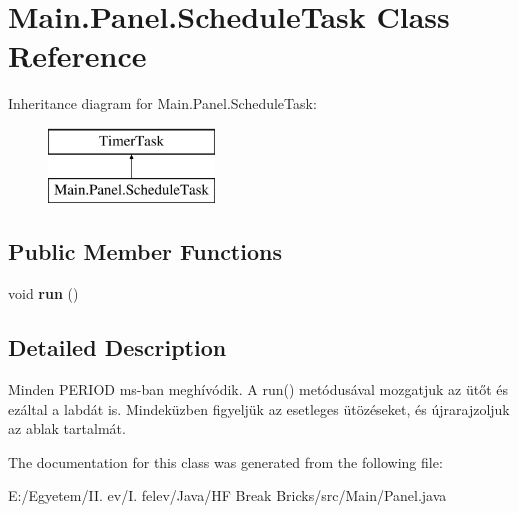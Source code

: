 \hypertarget{class_main_1_1_panel_1_1_schedule_task}{}\section{Main.\+Panel.\+Schedule\+Task Class Reference}
\label{class_main_1_1_panel_1_1_schedule_task}
Inheritance diagram for Main.\+Panel.\+Schedule\+Task\+:\begin{figure}[H]
\begin{center}
\leavevmode
\includegraphics[height=2.000000cm]{class_main_1_1_panel_1_1_schedule_task}
\end{center}
\end{figure}
\subsection*{Public Member Functions}
\begin{DoxyCompactItemize}
\item 
void {\bfseries run} ()\hypertarget{class_main_1_1_panel_1_1_schedule_task_a5ff577b290e9615719387a147318872f}{}\label{class_main_1_1_panel_1_1_schedule_task_a5ff577b290e9615719387a147318872f}

\end{DoxyCompactItemize}


\subsection{Detailed Description}
Minden P\+E\+R\+I\+OD ms-\/ban meghívódik. A run() metódusával mozgatjuk az ütőt és ezáltal a labdát is. Mindeküzben figyeljük az esetleges ütözéseket, és újrarajzoljuk az ablak tartalmát. 

The documentation for this class was generated from the following file\+:\begin{DoxyCompactItemize}
\item 
E\+:/\+Egyetem/\+I\+I. ev/\+I. felev/\+Java/\+H\+F Break Bricks/src/\+Main/Panel.\+java\end{DoxyCompactItemize}
